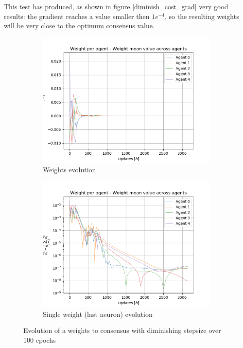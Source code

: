 \documentclass[a4paper,11pt,oneside]{book}
\begin{document}
This test has produced, as shown in figure \ref{diminish_cost_grad} very good results: the gradient reaches a value smaller then $1e^{-4}$, so the resulting weights will be very close to the optimum consensus value. 

\begin{figure}[h]
\centering
	\begin{subfigure}{0.49\textwidth}	
	\includegraphics[width=\textwidth]{diminishing/weight_100}
	\caption{Weights evolution}
	\end{subfigure}
\hfill
	\begin{subfigure}{0.49\textwidth}	
	\includegraphics[width=\textwidth]{diminishing/weight_100_log}
	\caption{Single weight (last neuron) evolution}
	\end{subfigure}
\caption{Evolution of a weights to consensus with diminishing stepsize over 100 epochs}
\label{diminish_weights}
\end{figure}
\bigskip
\end{document}
